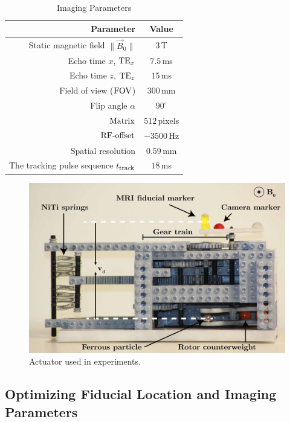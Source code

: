 \documentclass[journal]{IEEEtran}
\newcommand{\norm}[1]{\lVert#1\rVert}
\begin{document}
\begin{table}[b]
\vspace{-10pt}
\centering
\scriptsize
\caption{Imaging Parameters}
\label{tab:imagingparameters}
\begin{tabular}{r | c}
	\textbf{Parameter}  & \textbf{Value} \\
	\hline
	Static magnetic field $\norm{\vec{B}_0}$ & $3\,$T\\
	Echo time $x$, $\textnormal{TE}_{x}$ & $7.5\,$ms\\
	Echo time $z$, $\textnormal{TE}_{z}$ & $15\,$ms\\ 
	Field of view ($\textnormal{FOV}$) & $300\,$mm\\
	Flip angle  $\alpha$ & $90^\circ$\\
	$\textnormal{Matrix}$ & $512\,$pixels\\
	$\textnormal{RF-offset}$ & $-3500\,$Hz\\
	Spatial resolution & $0.59\,$mm  \\
	The tracking pulse sequence $t_\textnormal{track}$&$ 18\,$ms
\end{tabular}
\normalsize
\end{table}



\begin{figure}[t]
\begin{center}
	\includegraphics[width=0.9\columnwidth]{Figure7.jpg}
\end{center}
\caption{Actuator used in experiments.}
\label{fig:experimental-setup}
\vspace{-10pt}
\end{figure}

\subsection{Optimizing Fiducial Location and Imaging Parameters}\label{subsec:rotorImaging}
\end{document}
